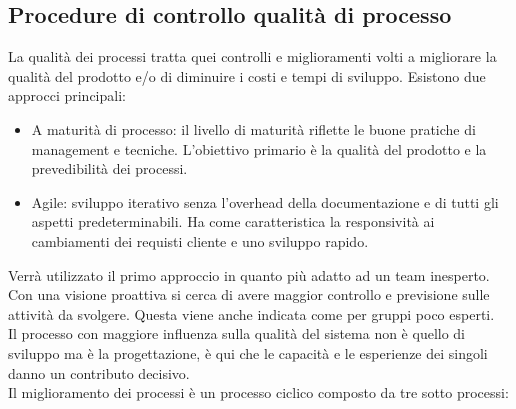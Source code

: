 	\subsection{Procedure di controllo qualità di processo} %
	La qualità dei processi tratta quei controlli e miglioramenti volti a migliorare la qualità del prodotto e/o di diminuire i costi e tempi di sviluppo. Esistono due approcci principali:
	\begin{itemize}
		\item A maturità di processo: il livello di maturità riflette le buone pratiche di management e tecniche. L'obiettivo primario è la qualità del prodotto e la prevedibilità dei processi.
		\item Agile: sviluppo iterativo senza l'overhead della documentazione e di tutti gli aspetti predeterminabili. Ha come caratteristica la responsività ai cambiamenti dei requisti cliente e uno sviluppo rapido.
	\end{itemize}
	Verrà utilizzato il primo approccio in quanto più adatto ad un team inesperto. Con una visione proattiva si cerca di avere maggior controllo e previsione sulle attività da svolgere. Questa viene anche indicata come  per gruppi poco esperti.\\
	Il processo con maggiore influenza sulla qualità del sistema non è quello di sviluppo ma è la progettazione, è qui che le capacità e le esperienze dei singoli danno un contributo decisivo.\\
	Il miglioramento dei processi è un processo ciclico composto da tre sotto processi:
	
